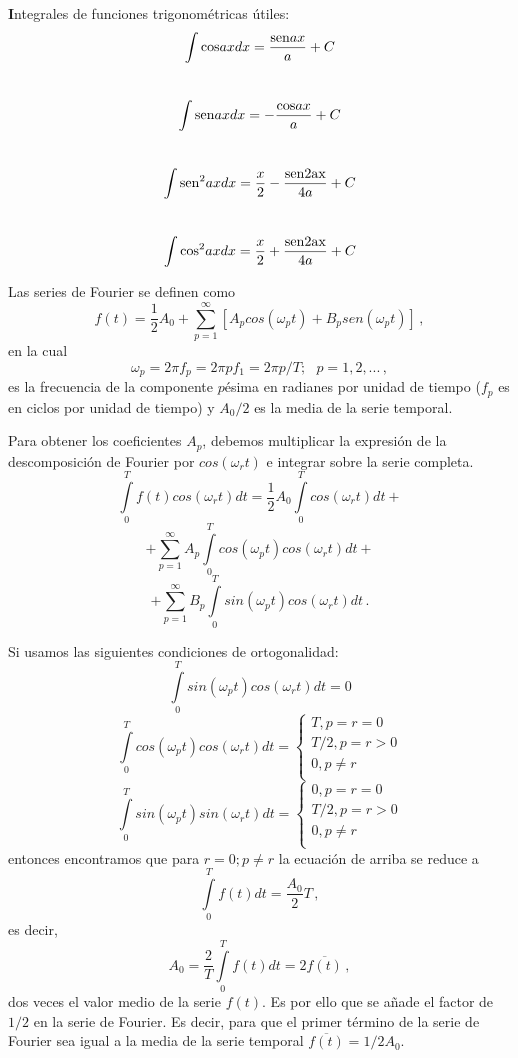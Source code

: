 \documentclass[
]{agujournal2019}
\begin{document}
\begin{framed}
{\noindent \textbf Integrales de funciones trigonométricas útiles:}
\\
$$\int {\rm cos} ax dx =\frac{{\rm sen} ax}{a} + C$$
\\
$$\int {\rm sen} ax dx =-\frac{{\rm cos} ax}{a} + C$$
\\
$$\int {\rm sen}^2 ax dx =\frac{x}{2}-\frac{\rm{sen} 2ax}{4a} + C$$
\\
$$\int {\rm cos}^2 ax dx =\frac{x}{2}+\frac{\rm{sen} 2ax}{4a} + C$$

\end{framed}

Las series de Fourier se definen como
\[f(t)=\frac{1}{2}A_0 +\sum\limits^\infty_{p=1}[A_p cos(\omega_p t) + B_p sen(\omega_p t)]\,,\]
en la cual
\[\omega_p=2\pi f_p=2\pi p f_1=2\pi p /T;\,\,\,\,p=1,2,...\,,\] es la
frecuencia de la componente \(p\)ésima en radianes por unidad de tiempo
(\(f_p\) es en ciclos por unidad de tiempo) y \(A_0/2\) es la media de
la serie temporal.

Para obtener los coeficientes \(A_p\), debemos multiplicar la expresión
de la descomposición de Fourier por \(cos(\omega_r t)\) e integrar sobre
la serie completa.
\[\int\limits^{T}_{0}f(t)cos(\omega_r t)dt=\frac{1}{2}A_0\int\limits^{T}_{0} cos(\omega_r t) dt + \]
\[+\sum\limits^\infty_{p=1} A_p \int\limits^{T}_{0}cos(\omega_p t)cos(\omega_r t) dt +\]
\[+\sum\limits^\infty_{p=1} B_p \int\limits^{T}_{0}sin(\omega_p t)cos(\omega_r t) dt\,.\]

Si usamos las siguientes condiciones de ortogonalidad:
\[\int\limits^{T}_{0}sin(\omega_p t)cos(\omega_r t) dt=0\]
\[\int\limits^{T}_{0}cos(\omega_p t)cos(\omega_r t) dt=
 \left\lbrace
  \begin{array}{l}
     T, p=r=0 \\
     T/2,p=r>0 \\
     0, p\ne r \\
  \end{array}
  \right.\] \[\int\limits^{T}_{0}sin(\omega_p t)sin(\omega_r t) dt=
 \left\lbrace
  \begin{array}{l}
     0, p=r=0 \\
     T/2,p=r>0 \\
     0, p\ne r \\
  \end{array}
  \right.\] entonces encontramos que para \(r=0;p\ne r\) la ecuación de
arriba se reduce a \[\int\limits^{T}_{0}f(t)dt=\frac{A_0}{2}T\,,\] es
decir, \[A_0=\frac{2}{T}\int\limits^{T}_{0}f(t)dt=2\overline{f(t)}\,,\]
dos veces el valor medio de la serie \(f(t)\). Es por ello que se añade
el factor de \(1/2\) en la serie de Fourier. Es decir, para que el
primer término de la serie de Fourier sea igual a la media de la serie
temporal \(\overline{f(t)}=1/2A_0\).
\end{document}
